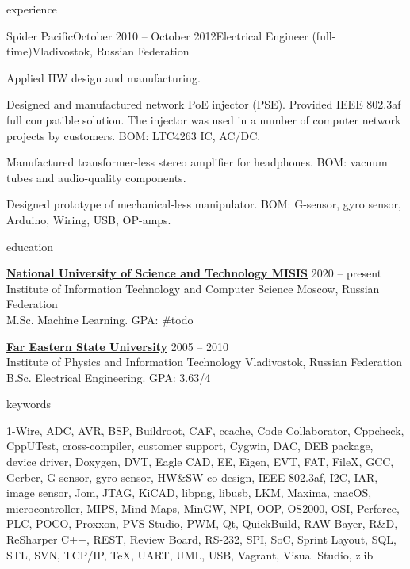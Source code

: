 \documentclass{template}
\begin{document}
\begin{rSection}{experience}
\begin{rCompany}{Spider Pacific}{October 2010 -- October 2012}{Electrical Engineer (full-time)}{Vladivostok, Russian Federation}
\item Applied HW design and manufacturing.
\item Designed and manufactured network PoE injector (PSE). Provided IEEE 802.3af full compatible solution. \newline
      The injector was used in a number of computer network projects by customers. BOM: LTC4263 IC, AC/DC.
\item Manufactured transformer-less stereo amplifier for headphones. BOM: vacuum tubes and audio-quality components.
\item Designed prototype of mechanical-less manipulator. BOM: G-sensor, gyro sensor, Arduino, Wiring, USB, OP-amps.


\end{rCompany}
\end{rSection}

\begin{rSection}{education}

{\bf \href{https://en.misis.ru}{National University of Science and Technology MISIS}} \hfill {2020 -- present} \\
Institute of Information Technology and Computer Science \hfill {Moscow, Russian Federation} \\
M.Sc. Machine Learning. GPA: \#todo

{\bf \href{https://www.dvfu.ru/en/}{Far Eastern State University}} \hfill {2005 -- 2010} \\
Institute of Physics and Information Technology \hfill {Vladivostok, Russian Federation} \\
B.Sc. Electrical Engineering. GPA: 3.63/4

\end{rSection}

\begin{rSection}{keywords}

1-Wire, ADC, AVR, BSP, Buildroot, CAF, ccache,
Code Collaborator, Cppcheck, CppUTest, cross-compiler, customer support, Cygwin, DAC, DEB package, device driver, Doxygen, DVT, Eagle CAD,
EE, Eigen, EVT, FAT, FileX, GCC, Gerber, G-sensor, gyro sensor, HW\&SW co-design, IEEE 802.3af, I2C, IAR, image sensor,
Jom, JTAG, KiCAD, libpng, libusb, LKM, Maxima, macOS, microcontroller, MIPS, Mind Maps, MinGW, NPI, OOP, OS2000, OSI, Perforce,
PLC, POCO, Proxxon, PVS-Studio, PWM, Qt, QuickBuild, RAW Bayer, R\&D, ReSharper C++, REST, Review Board, RS-232, SPI, SoC,
Sprint Layout, SQL, STL, SVN, TCP/IP, TeX, UART, UML, USB, Vagrant, Visual Studio, zlib

\end{rSection}
\end{document}
